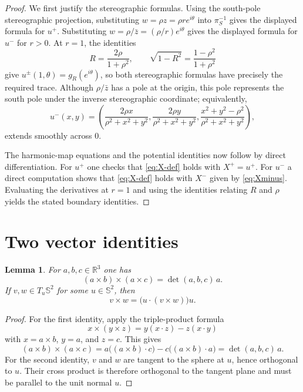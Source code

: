 \documentclass[11pt]{amsart}
\numberwithin{equation}{section}
\newtheorem{lemma}[theorem]{Lemma}
\theoremstyle{remark}
\newcommand{\R}{\mathbb{R}}
\newcommand{\Sph}{\mathbb{S}^2}
\begin{document}
\begin{proof}
We first justify the stereographic formulas. Using the south-pole stereographic projection, substituting $w=\rho z=\rho r e^{i\theta}$ into
$\pi_S^{-1}$ gives the displayed formula for $u^+$. Substituting $w=\rho/\bar z=(\rho/r)e^{i\theta}$ gives the displayed formula for $u^-$ for
$r>0$. At $r=1$, the identities
\[
 R=\frac{2\rho}{1+\rho^2},
 \qquad
 \sqrt{1-R^2}=\frac{1-\rho^2}{1+\rho^2}
\]
give $u^\pm(1,\theta)=g_R(e^{i\theta})$, so both stereographic formulas have precisely the required trace. Although $\rho/\bar z$ has a pole
at the origin, this pole represents the south pole under the inverse stereographic coordinate; equivalently,
\[
 u^-(x,y)=\left(\frac{2\rho x}{\rho^2+x^2+y^2},\frac{2\rho y}{\rho^2+x^2+y^2},\frac{x^2+y^2-\rho^2}{\rho^2+x^2+y^2}\right),
\]
extends smoothly across $0$.

The harmonic-map equations and the potential identities now follow by direct differentiation. For $u^+$ one checks that \eqref{eq:X-def} holds
with $X^+=u^+$. For $u^-$ a direct computation shows that \eqref{eq:X-def} holds with $X^-$ given by \eqref{eq:Xminus}. Evaluating the
derivatives at $r=1$ and using the identities relating $R$ and $\rho$ yields the stated boundary identities.
\end{proof}

\section{Two vector identities}\label{app:vectors}

\begin{lemma}\label{lem:vector-identities}
For $a,b,c\in\R^3$ one has
\[
(a\times b)\times(a\times c)=\det(a,b,c)\,a.
\]
If $v,w\in T_u\Sph$ for some $u\in\Sph$, then
\[
v\times w=\bigl(u\cdot(v\times w)\bigr)u.
\]
\end{lemma}

\begin{proof}
For the first identity, apply the triple-product formula
\[
x\times(y\times z)=y(x\cdot z)-z(x\cdot y)
\]
with $x=a\times b$, $y=a$, and $z=c$. This gives
\[
(a\times b)\times(a\times c)
=a\bigl((a\times b)\cdot c\bigr)-c\bigl((a\times b)\cdot a\bigr)
=\det(a,b,c)\,a.
\]
For the second identity, $v$ and $w$ are tangent to the sphere at $u$, hence orthogonal to $u$. Their cross product is therefore orthogonal to
the tangent plane and must be parallel to the unit normal $u$.
\end{proof}
\end{document}
